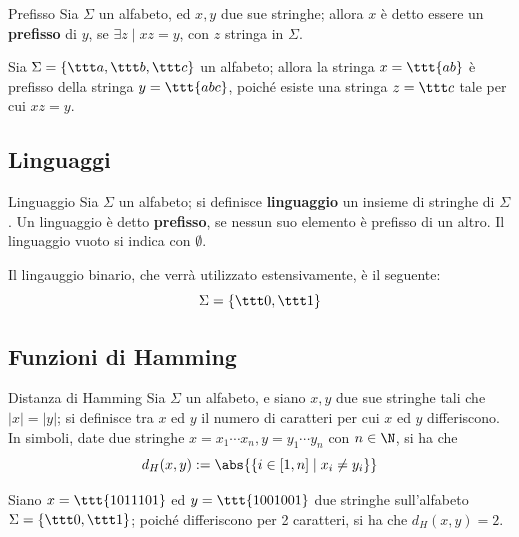 \documentclass[a4paper, 12pt]{report}
\begin{document}
    \begin{frameddefn}{Prefisso}
        Sia $\Sigma$ un alfabeto, ed $x, y$ due sue stringhe; allora $x$ è detto essere un \textbf{prefisso} di $y$, se $\exists z \mid xz = y$, con $z$ stringa in $\Sigma$.
    \end{frameddefn}

    \begin{example}[Prefisso]
        Sia $\Sigma = \{\ttt a,\ttt  b,\ttt  c\}$ un alfabeto; allora la stringa $x = \ttt{ab}$ è prefisso della stringa $y = \ttt{abc}$, poiché esiste una stringa $z = \ttt c$ tale per cui $xz = y$.
    \end{example}
    
    \subsection{Linguaggi}

    \begin{frameddefn}{Linguaggio}
        Sia $\Sigma$ un alfabeto; si definisce \textbf{linguaggio} un insieme di stringhe di $\Sigma$. Un linguaggio è detto \textbf{prefisso}, se nessun suo elemento è prefisso di un altro. Il linguaggio vuoto si indica con $\emptyset$.
    \end{frameddefn}

    \begin{example}
        Il lingauggio binario, che verrà utilizzato estensivamente, è il seguente: $$\Sigma = \{ \ttt 0, \ttt 1 \}$$
    \end{example}

    \subsection{Funzioni di Hamming}

    \begin{frameddefn}{Distanza di Hamming}
        Sia $\Sigma$ un alfabeto, e siano $x, y$ due sue stringhe tali che $|x| = |y|$; si definisce  tra $x$ ed $y$ il numero di caratteri per cui $x$ ed $y$ differiscono. In simboli, date due stringhe $x = x_1 \cdots x_n, y = y_1 \cdots y_n$ con $n \in \N$, si ha che $$d_H(x, y) := \abs{\{i \in [1, n] \mid x_i \neq y_i \}}$$
    \end{frameddefn}

    \begin{example}
        Siano $x = \ttt{1011101}$ ed $y = \ttt{1001001}$ due stringhe sull'alfabeto $\Sigma = \{ \ttt 0, \ttt 1 \}$; poiché differiscono per 2 caratteri, si ha che $d_H(x, y) = 2$.
    \end{example}
\end{document}
